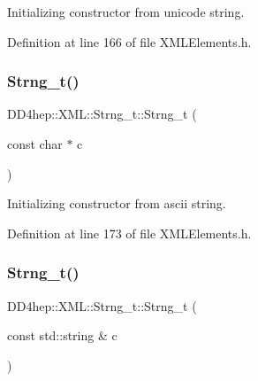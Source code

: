 Initializing constructor from unicode string. 



Definition at line 166 of file X\+M\+L\+Elements.\+h.

\hypertarget{class_d_d4hep_1_1_x_m_l_1_1_strng__t_ac846845ea068229d358849a6be38481e}{}\label{class_d_d4hep_1_1_x_m_l_1_1_strng__t_ac846845ea068229d358849a6be38481e} 
\subsubsection{\texorpdfstring{Strng\+\_\+t()}{Strng\_t()}\hspace{0.1cm}{\footnotesize\ttfamily [2/4]}}
{\footnotesize\ttfamily D\+D4hep\+::\+X\+M\+L\+::\+Strng\+\_\+t\+::\+Strng\+\_\+t (\begin{DoxyParamCaption}\item[{const char $\ast$}]{c }\end{DoxyParamCaption})\hspace{0.3cm}{\ttfamily [inline]}}



Initializing constructor from ascii string. 



Definition at line 173 of file X\+M\+L\+Elements.\+h.

\hypertarget{class_d_d4hep_1_1_x_m_l_1_1_strng__t_a494da46642509d83375a96a6ce725ad4}{}\label{class_d_d4hep_1_1_x_m_l_1_1_strng__t_a494da46642509d83375a96a6ce725ad4} 
\subsubsection{\texorpdfstring{Strng\+\_\+t()}{Strng\_t()}\hspace{0.1cm}{\footnotesize\ttfamily [3/4]}}
{\footnotesize\ttfamily D\+D4hep\+::\+X\+M\+L\+::\+Strng\+\_\+t\+::\+Strng\+\_\+t (\begin{DoxyParamCaption}\item[{const std\+::string \&}]{c }\end{DoxyParamCaption})\hspace{0.3cm}{\ttfamily [inline]}}



